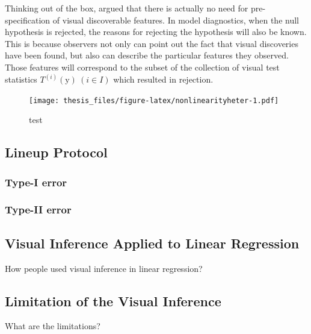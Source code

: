 \documentclass{monashthesis}
\begin{document}
Thinking out of the box, \textcite{buja_statistical_2009} argued that there is actually no need for pre-specification of visual discoverable features. In model diagnostics, when the null hypothesis is rejected, the reasons for rejecting the hypothesis will also be known. This is because observers not only can point out the fact that visual discoveries have been found, but also can describe the particular features they observed. Those features will correspond to the subset of the collection of visual test statistics \(T^{(i)}(\boldsymbol{\mathrm{y}})~(i \in I)\) which resulted in rejection.

\begin{figure}
\centering
\texttt{[image: thesis\_files/figure-latex/nonlinearityheter-1.pdf]}
\caption{\label{fig:nonlinearityheter}test}
\end{figure}

\hypertarget{lineup-protocol}{%
\subsection{Lineup Protocol}\label{lineup-protocol}}

\hypertarget{type-i-error}{%
\subsubsection{Type-I error}\label{type-i-error}}

\hypertarget{type-ii-error}{%
\subsubsection{Type-II error}\label{type-ii-error}}

\hypertarget{visual-inference-applied-to-linear-regression}{%
\subsection{Visual Inference Applied to Linear Regression}\label{visual-inference-applied-to-linear-regression}}

How people used visual inference in linear regression?

\hypertarget{limitation-of-the-visual-inference}{%
\subsection{Limitation of the Visual Inference}\label{limitation-of-the-visual-inference}}

What are the limitations?
\end{document}
